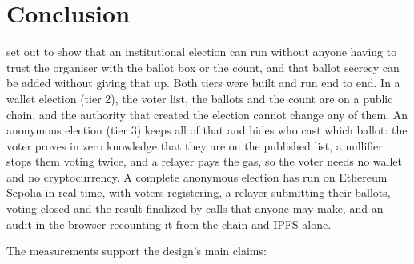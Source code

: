 \section{Conclusion}

\projectname{} set out to show that an institutional election can run without
anyone having to trust the organiser with the ballot box or the count, and
that ballot secrecy can be added without giving that up. Both tiers were built
and run end to end. In a wallet election (tier 2), the voter list, the ballots
and the count are on a public chain, and the authority that created the
election cannot change any of them. An anonymous election (tier 3) keeps all of
that and hides who cast which ballot: the voter proves in zero knowledge that
they are on the published list, a nullifier stops them voting twice, and a
relayer pays the gas, so the voter needs no wallet and no cryptocurrency. A
complete anonymous election has run on Ethereum Sepolia in real time, with
voters registering, a relayer submitting their ballots, voting closed and the
result finalized by calls that anyone may make, and an audit in the browser
recounting it from the chain and IPFS alone.

The measurements support the design's main claims:


